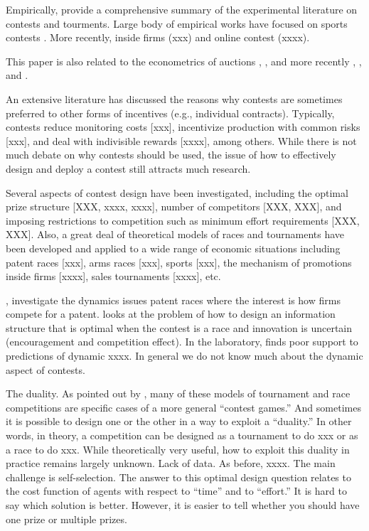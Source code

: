\documentclass[12pt,]{article}
\theoremstyle{plain} %
\begin{document}
Empirically, \citet{dechenaux2014survey} provide a comprehensive summary
of the experimental literature on contests and tourments. Large body of
empirical works have focused on sports contests
\citet{szymanski2003economic}. More recently, inside firms (xxx) and
online contest (xxxx).

This paper is also related to the econometrics of auctions
\citet{paarsch1992deciding}, \citet{laffont1995econometrics},
\citet{donald1996identification} and more recently
\citet{athey2011comparing}, \citet{athey2002identification}, and
\citet{athey2007nonparametric}.

An extensive literature has discussed the reasons why contests are
sometimes preferred to other forms of incentives (e.g., individual
contracts). Typically, contests reduce monitoring costs {[}xxx{]},
incentivize production with common risks {[}xxx{]}, and deal with
indivisible rewards {[}xxxx{]}, among others. While there is not much
debate on why contests should be used, the issue of how to effectively
design and deploy a contest still attracts much research.

Several aspects of contest design have been investigated, including the
optimal prize structure {[}XXX, xxxx, xxxx{]}, number of competitors
{[}XXX, XXX{]}, and imposing restrictions to competition such as minimum
effort requirements {[}XXX, XXX{]}. Also, a great deal of theoretical
models of races and tournaments have been developed and applied to a
wide range of economic situations including patent races {[}xxx{]}, arms
races {[}xxx{]}, sports {[}xxx{]}, the mechanism of promotions inside
firms {[}xxxx{]}, sales tournaments {[}xxxx{]}, etc.

\citet{harris1987racing}, \citet{grossman1987dynamic} investigate the
dynamics issues patent races where the interest is how firms compete for
a patent. \citet{bimpikis2014designing} looks at the problem of how to
design an information structure that is optimal when the contest is a
race and innovation is uncertain (encouragement and competition effect).
In the laboratory, \citet{zizzo2002racing} finds poor support to
predictions of dynamic xxxx. In general we do not know much about the
dynamic aspect of contests.

The duality. As pointed out by \citet{baye2003strategic}, many of these
models of tournament and race competitions are specific cases of a more
general ``contest games.'' And sometimes it is possible to design one or
the other in a way to exploit a ``duality.'' In other words, in theory,
a competition can be designed as a tournament to do xxx or as a race to
do xxx. While theoretically very useful, how to exploit this duality in
practice remains largely unknown. Lack of data. As before, xxxx. The
main challenge is self-selection. The answer to this optimal design
question relates to the cost function of agents with respect to ``time''
and to ``effort.'' It is hard to say which solution is better. However,
it is easier to tell whether you should have one prize or multiple
prizes.
\end{document}
